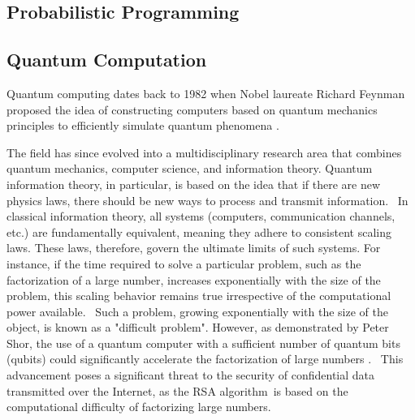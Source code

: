 \subsection*{Probabilistic Programming}


\subsection*{Quantum Computation}






Quantum computing dates back to 1982 when Nobel laureate Richard Feynman proposed the idea of constructing computers based on quantum mechanics principles to efficiently simulate quantum phenomena \cite{feynman2018simulating}. 

The field has since evolved into a multidisciplinary research area that combines quantum mechanics, computer science, and information theory. Quantum information theory, in particular, is based on the idea that if there are new physics laws, there should be new ways to process and transmit information.  In classical information theory, all systems (computers, communication channels, etc.) are fundamentally equivalent, meaning they adhere to consistent scaling laws. These laws, therefore, govern the ultimate limits of such systems. For instance, if the time required to solve a particular problem, such as the factorization of a large number, increases exponentially with the size of the problem, this scaling behavior remains true irrespective of the computational power available.  Such a problem, growing exponentially with the size of the object, is known as a "difficult problem". However, as demonstrated by Peter Shor, the use of a quantum computer with a sufficient number of quantum bits (qubits) could significantly accelerate the factorization of large numbers \cite{shor1994algorithms}.  This advancement poses a significant threat to the security of confidential data transmitted over the Internet, as the RSA algorithm is based on the computational difficulty of factorizing large numbers.

